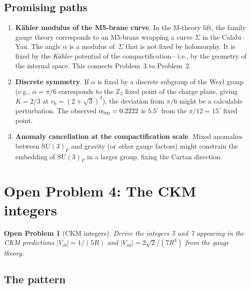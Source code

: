 \documentclass[12pt,a4paper]{article}
\newcommand{\SU}{\mathrm{SU}}
\newtheorem{problem}{Open Problem}
\begin{document}
\subsection{Promising paths}

\begin{enumerate}[label=(\alph*)]
\item \textbf{K\"ahler modulus of the M5-brane curve}.  In the M-theory
  lift, the family gauge theory corresponds to an M5-brane wrapping a
  curve $\Sigma$ in the Calabi--Yau.  The angle $\alpha$ is a modulus
  of~$\Sigma$ that is not fixed by holomorphy.  It is fixed by the
  \emph{K\"ahler} potential of the compactification---i.e., by the
  geometry of the internal space.  This connects Problem~3 to Problem~2.

\item \textbf{Discrete symmetry}.  If $\alpha$ is fixed by a discrete
  subgroup of the Weyl group (e.g., $\alpha = \pi/6$ corresponds to the
  $\mathbb{Z}_3$ fixed point of the charge plane, giving $K = 2/3$ at
  $r_0 = (2+\sqrt{3})^2$), the deviation from $\pi/6$ might be
  a calculable perturbation.  The observed $\alpha_{\rm lep} = 0.2222$ is
  $5.5^\circ$ from the $\pi/12 = 15^\circ$ fixed point.

\item \textbf{Anomaly cancellation at the compactification scale}.
  Mixed anomalies between $\SU(3)_F$ and gravity (or other gauge factors)
  might constrain the embedding of $\SU(3)_F$ in a larger group, fixing
  the Cartan direction.
\end{enumerate}


\section{Open Problem 4: The CKM integers}
\label{sec:ckm}

\begin{problem}[CKM integers]
Derive the integers 5 and 7 appearing in the CKM predictions
$|V_{cb}| = 1/(5R)$ and $|V_{ub}| = 2\sqrt{2}/(7R^3)$ from the
gauge theory.
\end{problem}

\subsection{The pattern}
\end{document}
